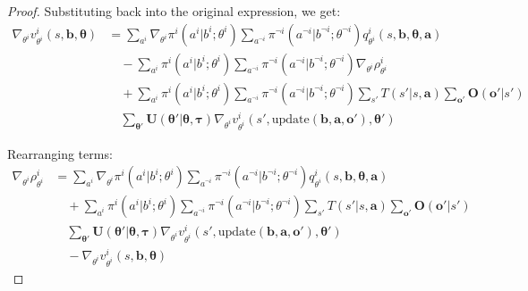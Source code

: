 \begin{proof}
    Substituting back into the original expression, we get:
    \begin{align}
        \nabla_{\theta^i}v^{i}_{\theta^i}(s, \boldsymbol{b}, \boldsymbol{\theta}) & = \sum_{a^i}\nabla_{\theta^i}\pi^{i}(a^{i}|b^{i}; \theta^{i}) \sum_{a^{\neg i}}\pi^{\neg i}(a^{\neg i}|b^{\neg i}; \theta^{\neg i}) q^{i}_{\theta^i}(s, \boldsymbol{b}, \boldsymbol{\theta}, \boldsymbol{a})                             \\
                                                                                  & \quad - \sum_{a^i}\pi^{i}(a^{i}|b^{i}; \theta^{i}) \sum_{a^{\neg i}}\pi^{\neg i}(a^{\neg i}|b^{\neg i}; \theta^{\neg i}) \nabla_{\theta^i}\rho^{i}_{\theta^i}                                                                            \\
                                                                                  & \quad + \sum_{a^i}\pi^{i}(a^{i}|b^{i}; \theta^{i}) \sum_{a^{\neg i}}\pi^{\neg i}(a^{\neg i}|b^{\neg i}; \theta^{\neg i}) \sum_{s'}T(s'|s, \boldsymbol{a}) \sum_{\boldsymbol{o}'}\boldsymbol{O}(\boldsymbol{o}'|s')                       \\
                                                                                  & \quad \sum_{\boldsymbol{\theta}'}\boldsymbol{U}(\boldsymbol{\theta}'|\boldsymbol{\theta}, \boldsymbol{\tau}) \nabla_{\theta^i}v^{i}_{\theta^i}(s', \text{update}(\boldsymbol{b}, \boldsymbol{a}, \boldsymbol{o}'), \boldsymbol{\theta}')
    \end{align}

    Rearranging terms:
    \begin{align}
        \nabla_{\theta^i}\rho^{i}_{\theta^i} & = \sum_{a^i}\nabla_{\theta^i}\pi^{i}(a^{i}|b^{i}; \theta^{i}) \sum_{a^{\neg i}}\pi^{\neg i}(a^{\neg i}|b^{\neg i}; \theta^{\neg i}) q^{i}_{\theta^i}(s, \boldsymbol{b}, \boldsymbol{\theta}, \boldsymbol{a})                             \\
                                             & \quad + \sum_{a^i}\pi^{i}(a^{i}|b^{i}; \theta^{i}) \sum_{a^{\neg i}}\pi^{\neg i}(a^{\neg i}|b^{\neg i}; \theta^{\neg i}) \sum_{s'}T(s'|s, \boldsymbol{a}) \sum_{\boldsymbol{o}'}\boldsymbol{O}(\boldsymbol{o}'|s')                       \\
                                             & \quad \sum_{\boldsymbol{\theta}'}\boldsymbol{U}(\boldsymbol{\theta}'|\boldsymbol{\theta}, \boldsymbol{\tau}) \nabla_{\theta^i}v^{i}_{\theta^i}(s', \text{update}(\boldsymbol{b}, \boldsymbol{a}, \boldsymbol{o}'), \boldsymbol{\theta}') \\
                                             & \quad - \nabla_{\theta^i}v^{i}_{\theta^i}(s, \boldsymbol{b}, \boldsymbol{\theta})
    \end{align}


\end{proof}
